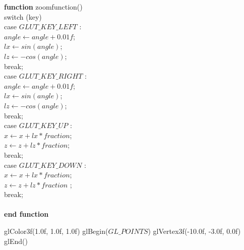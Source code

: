 \documentclass[letterpaper, 10 pt, conference]{ieeeconf}  %
\begin{document}
	\hspace*{5mm} \textbf{function} zoomfunction() \\
\hspace*{10mm}		switch (key) \\
\hspace*{15mm}			case $GLUT\_KEY\_LEFT$ :\\
\hspace*{20mm}				$angle \leftarrow angle+ 0.01f$;\\
\hspace*{20mm}				$lx \leftarrow sin(angle)$;\\
\hspace*{20mm}				$lz \leftarrow -cos(angle) $;\\
	\hspace*{15mm}			break;\\
\hspace*{15mm}			case $GLUT\_KEY\_RIGHT$ : \\
\hspace*{20mm}			$	angle \leftarrow angle +0.01f $; \\
\hspace*{20mm}				$lx \leftarrow sin(angle) $; \\
\hspace*{20mm}				$lz \leftarrow -cos(angle) $; \\
\hspace*{15mm}				break;\\
\hspace*{15mm}			case $GLUT\_KEY\_UP$ :\\
\hspace*{20mm}				$x \leftarrow x+ lx * fraction $;\\
\hspace*{20mm}				$z \leftarrow z+ lz * fraction $;\\
\hspace*{15mm}				break;\\
\hspace*{15mm}			case $GLUT\_KEY\_DOWN$ :\\
\hspace*{20mm}			$x \leftarrow x+lx * fraction $;\\
\hspace*{20mm}			$ z \leftarrow z+ lz * 	fraction $ ;\\
\hspace*{15mm}				break; \\ \\ 
\hspace*{5mm} \textbf{end function}
\begin{algorithmic}
\State		glColor3f(1.0f, 1.0f, 1.0f) \;
\State		glBegin($GL\_POINTS$) \;
  \State  		glVertex3f(-10.0f, -3.0f, 0.0f) \;
  \State glEnd() \;
\EndFunction
\end{algorithmic}
\end{document}
